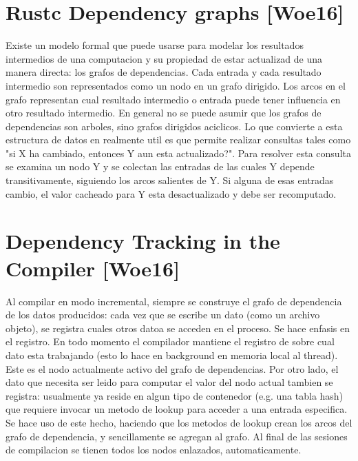 \documentclass[12pt, a4paper]{report}
\begin{document}
  \section*{Rustc Dependency graphs [Woe16]}

    Existe un modelo formal que puede usarse para modelar los resultados intermedios de una computacion y su propiedad de estar actualizad de una manera directa: los grafos de dependencias.
    Cada entrada y cada resultado intermedio son representados como un nodo en un grafo dirigido.
    Los arcos en el grafo representan cual resultado intermedio o entrada puede tener influencia en otro resultado intermedio.
    En general no se puede asumir que los grafos de dependencias son arboles, sino grafos dirigidos aciclicos.
    Lo que convierte a esta estructura de datos en realmente util es que permite realizar consultas tales como "si X ha cambiado, entonces Y aun esta actualizado?".
    Para resolver esta consulta se examina un nodo Y y se colectan las entradas de las cuales Y depende transitivamente, siguiendo los arcos salientes de Y.
    Si alguna de esas entradas cambio, el valor cacheado para Y esta desactualizado y debe ser recomputado.
    \cite{rust_blog_incremental_compilation}

  \section*{Dependency Tracking in the Compiler [Woe16]}

    Al compilar en modo incremental, siempre se construye el grafo de dependencia de los datos producidos: cada vez que se escribe un dato (como un archivo objeto), se registra cuales otros datoa se acceden en el proceso.
    Se hace enfasis en el registro. En todo momento el compilador mantiene el registro de sobre cual dato esta trabajando (esto lo hace en background en memoria local al thread).
    Este es el nodo actualmente activo del grafo de dependencias.
    Por otro lado, el dato que necesita ser leido para computar el valor del nodo actual tambien se registra: usualmente ya reside en algun tipo de contenedor (e.g. una tabla hash) que requiere invocar un metodo de lookup para acceder a una entrada especifica.
    Se hace uso de este hecho, haciendo que los metodos de lookup crean los arcos del grafo de dependencia, y sencillamente se agregan al grafo.
    Al final de las sesiones de compilacion se tienen todos los nodos enlazados, automaticamente.
    \cite{rust_blog_incremental_compilation}
\end{document}
